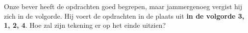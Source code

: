 \documentclass[12pt, a4paper]{article}
\begin{document}
\begin{minipage}{\textwidth}
			\begin{figure}[H]
				\flushleft
			\end{figure}
			
			Onze bever heeft de opdrachten goed begrepen, maar jammergenoeg vergist hij zich in de volgorde. Hij voert de opdrachten in de plaats uit \textbf{in de volgorde 3, 1, 2, 4}. Hoe zal zijn tekening er op het einde uitzien?
			

\end{minipage}
\end{document}
